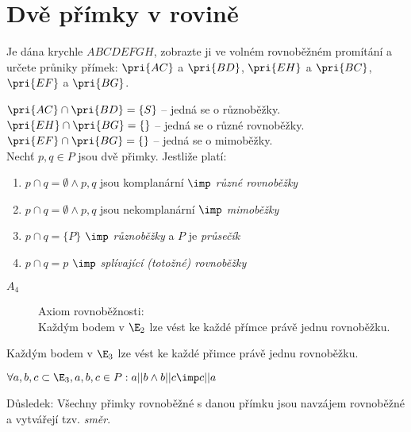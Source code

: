 
\let\braceru=\relax \let\bracelu=\relax 
\def\o#1{\setbox0=
	\hbox{$\kern2pt\overbrace{\kern-2pt#1\kern-2pt}\kern2pt$}\ht0=2.1ex\box0}
\def\to#1{\hbox{#1\rlap{\t{}}}}
\def\rad{\rm{rad}}
\def\f{\frac}
\BeginDoc{}
\section{Dvě přímky v rovině}
\Pr Je dána krychle $ABCDEFGH$, zobrazte ji ve volném rovnoběžném promítání a určete průniky přímek: $\pri{AC}$ a $\pri{BD}$, $\pri{EH}$ a $\pri{BC}$, $\pri{EF}$ a $\pri{BG}$.

$\pri{AC} \cap \pri{BD} = \{S\}$ -- jedná se o různoběžky.\\
$\pri{EH} \cap \pri{BG} = \{\}$ -- jedná se o různé rovnoběžky.\\
$\pri{EF} \cap \pri{BG} = \{\}$ -- jedná se o mimoběžky.\\

\Def Nechť $p,q \in P$ jsou dvě přimky. Jestliže platí:
\begin{enumerate}
	\item $p\cap q=\emptyset \land p,q$ jsou komplanární $\imp$ \emph{různé rovnoběžky}
	\item $p\cap q=\emptyset \land p,q$ jsou nekomplanární $\imp$ \emph{mimoběžky}
	\item $p\cap q = \{P\}$ $\imp$ \emph {různoběžky} a $P$ je \emph{průsečík}
	\item $p\cap q = p$ $\imp$ \emph{splívající (totožné) rovnoběžky}
\end{enumerate}

\begin{description}
	\item[$A_4$] Axiom rovnoběžnosti:\\
		Každým bodem v $\E_2$ lze vést ke každé přímce právě jednu rovnoběžku.

\end{description}
\V Každým bodem v $\E_3$ lze vést ke každé přimce právě jednu rovnoběžku.

$\forall a,b,c \subset \E_3 , a,b,c \in P: a || b \land b || c  \imp c||a$

Důsledek: Všechny přimky rovnoběžné s danou přímku jsou navzájem rovnoběžné a vytvářejí tzv. \emph{směr}.

\EndDoc
